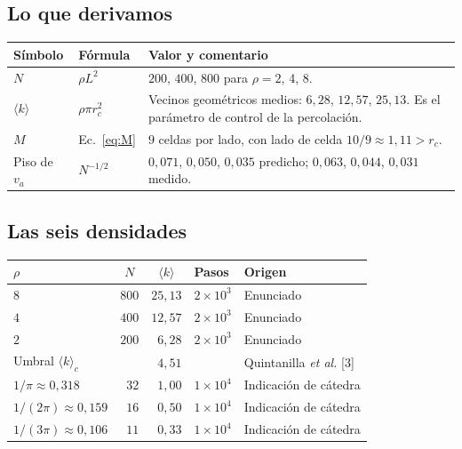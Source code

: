 \documentclass[11pt]{article}
\begin{document}
\subsection{Lo que derivamos}

\begin{center}
\begin{tabular}{llp{7.4cm}}
  \toprule
  Símbolo & Fórmula & Valor y comentario \\
  \midrule
  $N$ & $\rho L^2$        & $200$, $400$, $800$ para $\rho = 2$, 4, 8. \\
  $\langle k \rangle$ & $\rho \pi r_c^2$ & Vecinos geométricos medios: $6{,}28$, $12{,}57$, $25{,}13$. Es el parámetro de control de la percolación. \\
  $M$ & Ec.~\eqref{eq:M} & $9$ celdas por lado, con lado de celda $10/9 \approx 1{,}11 > r_c$. \\
  Piso de $v_a$ & $N^{-1/2}$ & $0{,}071$, $0{,}050$, $0{,}035$ predicho; $0{,}063$, $0{,}044$, $0{,}031$ medido. \\
  \bottomrule
\end{tabular}
\end{center}

\subsection{Las seis densidades}

\begin{center}
\begin{tabular}{lccll}
  \toprule
  $\rho$ & $N$ & $\langle k \rangle$ & Pasos & Origen \\
  \midrule
  $8$ & $800$ & $25{,}13$ & $2\times10^3$ & Enunciado \\
  $4$ & $400$ & $12{,}57$ & $2\times10^3$ & Enunciado \\
  $2$ & $200$ & $\phantom{0}6{,}28$ & $2\times10^3$ & Enunciado \\
  \midrule
  \multicolumn{2}{l}{Umbral $\langle k \rangle_c$} & $\phantom{0}4{,}51$ & & Quintanilla \emph{et al.} [3] \\
  \midrule
  $1/\pi \approx 0{,}318$    & $\phantom{0}32$ & $\phantom{0}1{,}00$ & $1\times10^4$ & Indicación de cátedra \\
  $1/(2\pi) \approx 0{,}159$ & $\phantom{0}16$ & $\phantom{0}0{,}50$ & $1\times10^4$ & Indicación de cátedra \\
  $1/(3\pi) \approx 0{,}106$ & $\phantom{0}11$ & $\phantom{0}0{,}33$ & $1\times10^4$ & Indicación de cátedra \\
  \bottomrule
\end{tabular}
\end{center}
\end{document}
